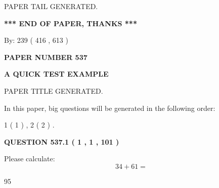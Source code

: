 \documentclass[12pt]{article}
\begin{document}
   
   
   
   
   
 \vspace{0.2in}
 
   
   
\vspace{2.0in} PAPER TAIL GENERATED.
   
   
   
   
\vspace{1.0in} 
{\textbf{\large{ *** END OF PAPER, THANKS *** }}} 
   
   
\hspace{1.0in} By: 
 239 ( 416 ,  613 )
   
   
   
   
\newpage 
\setcounter{page}{ 
   537001 } 
   
   
   
   
 {\textbf{ \Large{ PAPER NUMBER  537  }}}
   
   
\vspace{0.2in}
   
   
   
   
   
   
   
   
 \vspace{0.2in}
{\LARGE {\textbf{ A QUICK TEST EXAMPLE}}}
   
   
 PAPER TITLE GENERATED.
   
   
   
\vspace{0.2in}
   
In this paper, big questions will be generated in the following order: 
   
   
   1 ( 1 )
 ,
   2 ( 2 )
 .
  
\vspace{0.2in}
  
{\textbf{\Large{QUESTION
537.1 
 ( 1 , 1 , 101 )
}}}
  
  
 
Please calculate:
\begin{equation}
34 +  %
61 = \nonumber
\end{equation}
 
 
 
\noindent{}
 
 

95
 
\end{document}
